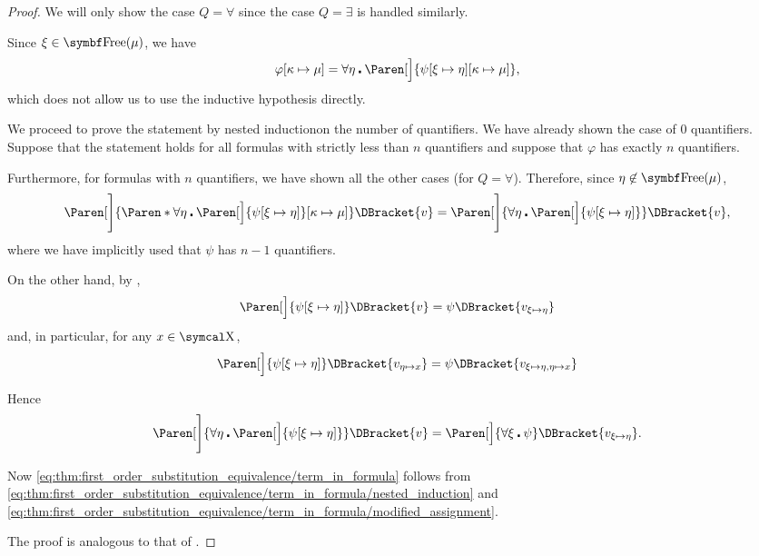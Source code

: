 \begin{proof}
  We will only show the case \( Q = \forall \) since the case \( Q = \exists \) is handled similarly.

  Since \( \xi \in \Bold{Free}(\mu) \), we have
  \begin{equation*}
    \varphi[\kappa \mapsto \mu]
    =
    \forall \eta \centerdot \Paren[\Big]{ \psi[\xi \mapsto \eta][\kappa \mapsto \mu] },
  \end{equation*}
  which does not allow us to use the inductive hypothesis directly.

  We proceed to prove the statement by nested induction\IND on the number of quantifiers. We have already shown the case of \( 0 \) quantifiers. Suppose that the statement holds for all formulas with strictly less than \( n \) quantifiers and suppose that \( \varphi \) has exactly \( n \) quantifiers.

  Furthermore, for formulas with \( n \) quantifiers, we have shown all the other cases (for \( Q = \forall \)). Therefore, since \( \eta \not\in \Bold{Free}(\mu) \),
  \begin{equation}\label{eq:thm:first_order_substitution_equivalence/term_in_formula/nested_induction}
    \Paren[\Bigg]{ \Paren*{ \forall \eta \centerdot \Paren[\Big]{ \psi[\xi \mapsto \eta] } }[\kappa \mapsto \mu] }\DBracket{v}
    =
    \Paren[\Bigg]{\forall \eta \centerdot \Paren[\Big]{ \psi[\xi \mapsto \eta] } }\DBracket{v},
  \end{equation}
  where we have implicitly used that \( \psi \) has \( n - 1 \) quantifiers.

  On the other hand, by ,
  \begin{equation*}
    \Paren[\Big]{ \psi[\xi \mapsto \eta] }\DBracket{v} = \psi\DBracket{v_{\xi \mapsto \eta}}
  \end{equation*}
  and, in particular, for any \( x \in \CX \),
  \begin{equation*}
    \Paren[\Big]{ \psi[\xi \mapsto \eta] }\DBracket{v_{\eta \mapsto x}} = \psi\DBracket{v_{\xi \mapsto \eta,\eta \mapsto x}}
  \end{equation*}

  Hence
  \begin{equation}\label{eq:thm:first_order_substitution_equivalence/term_in_formula/modified_assignment}
    \Paren[\Bigg]{\forall \eta \centerdot \Paren[\Big]{ \psi[\xi \mapsto \eta] } }\DBracket{v}
    =
    \Paren[\Big]{\forall \xi \centerdot \psi }\DBracket{v_{\xi \mapsto \eta}}.
  \end{equation}

  Now \eqref{eq:thm:first_order_substitution_equivalence/term_in_formula} follows from \eqref{eq:thm:first_order_substitution_equivalence/term_in_formula/nested_induction} and \eqref{eq:thm:first_order_substitution_equivalence/term_in_formula/modified_assignment}.

   The proof is analogous to that of .
\end{proof}
